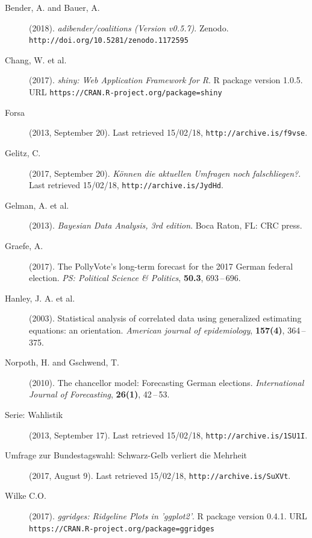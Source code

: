 \documentclass[twoside]{report}
\begin{document}




\begin{description}
\item[Bender, A. and Bauer, A.] (2018).
     {\it adibender/coalitions (Version v0.5.7)}.
     Zenodo. \texttt{http://doi.org/10.5281/zenodo.1172595}
\item[Chang, W. et al.] (2017).
     {\it shiny: Web Application Framework for R}.
     R package version 1.0.5.
     URL \texttt{https://CRAN.R-project.org/package=shiny}
\item[Forsa] (2013, September 20).
     Last retrieved 15/02/18, \texttt{http://archive.is/\allowbreak f9vse}.
\item[Gelitz, C.] (2017, September 20).
     {\it K\"{o}nnen die aktuellen Umfragen noch falsch\-liegen?}.
     Last retrieved 15/02/18, \texttt{http://archive.is/JydHd}.
\item[Gelman, A. et al.] (2013).
     {\it Bayesian Data Analysis, 3rd edition}.
     Boca Raton, FL: CRC press.
\item[Graefe, A.] (2017).
     The PollyVote's long-term forecast for the 2017 German federal election.
     {\it PS: Political Science \& Politics}, {\bf 50.3},
     693\,--\,696.
\item[Hanley, J. A. et al.] (2003).
     Statistical analysis of correlated data using generalized estimating equations: an orientation.
     {\it American journal of epidemiology}, {\bf 157(4)},
     364\,--\,375.
\item[Norpoth, H. and Gschwend, T.] (2010).
     The chancellor model: Forecasting German elections.
     {\it International Journal of Forecasting}, {\bf 26(1)},
     42\,--\,53.
\item[Serie: Wahlistik] (2013, September 17).
     Last retrieved 15/02/18, \texttt{http://\allowbreak archive.is/1SU1I}.
\item[Umfrage zur Bundestagswahl: Schwarz-Gelb verliert die Mehrheit] (2017, August 9).
     Last retrieved 15/02/18, \texttt{http://archive.is/SuXVt}.
\item[Wilke C.O.] (2017).
     {\it ggridges: Ridgeline Plots in 'ggplot2'}.
     R package version 0.4.1.
     URL \texttt{https://CRAN.R-project.org/package=ggridges}
\end{description}
\end{document}
